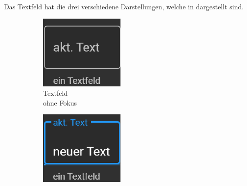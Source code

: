Das Textfeld hat die drei verschiedene Darstellungen, welche in  dargestellt sind.
\begin{figure}[ht]
  \centering
  \hspace{0.05\textwidth}
  \begin{subfigure}[h]{0.24\textwidth}
    \centering
    \includegraphics[width=\textwidth]{content/hauptteil/umsetzungPoC/frontend/res/TextfeldNoFokus.pdf}
    \caption{Textfeld \\ohne Fokus}
    \label{fig:frontend:poc:textFeld:noFocus}
  \end{subfigure}
  \hfill
  \begin{subfigure}[h]{0.24\textwidth}
    \centering
    \includegraphics[width=\textwidth]{content/hauptteil/umsetzungPoC/frontend/res/TextfeldFokus.pdf}

\end{subfigure}
\end{figure}
